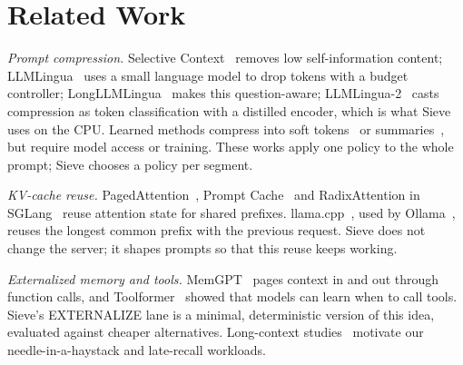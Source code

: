 \documentclass[journal]{IEEEtran}
\begin{document}
\section{Related Work}
\textit{Prompt compression.} Selective Context~\cite{li2023selective} removes low self-information content; LLMLingua~\cite{jiang2023llmlingua}
uses a small language model to drop tokens with a budget controller; LongLLMLingua~\cite{jiang2024longllmlingua} makes this question-aware;
LLMLingua-2~\cite{pan2024llmlingua2} casts compression as token classification with a distilled encoder, which is what Sieve uses on the CPU.
Learned methods compress into soft tokens~\cite{mu2023gist,chevalier2023autocompressor} or summaries~\cite{xu2024recomp}, but require
model access or training. These works apply one policy to the whole prompt; Sieve chooses a policy per segment.

\textit{KV-cache reuse.} PagedAttention~\cite{kwon2023vllm}, Prompt Cache~\cite{gim2024promptcache} and RadixAttention in
SGLang~\cite{zheng2024sglang} reuse attention state for shared prefixes. llama.cpp~\cite{llamacpp}, used by Ollama~\cite{ollama}, reuses the
longest common prefix with the previous request. Sieve does not change the server; it shapes prompts so that this reuse keeps working.

\textit{Externalized memory and tools.} MemGPT~\cite{packer2023memgpt} pages context in and out through function calls, and
Toolformer~\cite{schick2023toolformer} showed that models can learn when to call tools. Sieve's EXTERNALIZE lane is a minimal,
deterministic version of this idea, evaluated against cheaper alternatives. Long-context studies~\cite{liu2024lost,kamradt2023needle}
motivate our needle-in-a-haystack and late-recall workloads.
\end{document}
